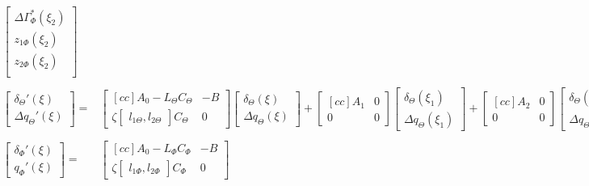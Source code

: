 \documentclass[main.tex]{subfiles}
\begin{document}
\begin{align}
\begin{bmatrix}
	\Delta \Gamma_\Phi^{*}(\xi_2) \\
	z_{1\Phi}(\xi_2) \\
	z_{2\Phi}(\xi_2) \\
	\end{bmatrix} \label{eq:SynthesisConAzi}\\
	\nonumber\\
	\begin{bmatrix}
	\delta_\Theta  '(\xi) \\
	\Delta q_\Theta'(\xi)
	\end{bmatrix} =&
	\begin{bmatrix}[cc]
	A_0 - L_\Theta C_\Theta & -B\\ 
	\zeta \begin{bmatrix}l_{1\Theta} , l_{2\Theta}	\end{bmatrix} C_\Theta & 0
	\end{bmatrix}
	\begin{bmatrix}
	\delta_\Theta (\xi)\\
	\Delta q_\Theta (\xi)
	\end{bmatrix} + 
	\begin{bmatrix}[cc]
	A_1 & 0\\ 
	0 & 0
	\end{bmatrix}
	\begin{bmatrix}
	\delta_\Theta (\xi_1)\\
	\Delta q_\Theta (\xi_1)
	\end{bmatrix} + 
	\begin{bmatrix}[cc]
	A_2 & 0\\ 
	0 & 0
	\end{bmatrix}
	\begin{bmatrix}
	\delta_\Theta (\xi_2)\\
	\Delta q_\Theta (\xi_2)
	\end{bmatrix} \label{eq:SynthesisObsInc}\\
    	\nonumber \\
    	\begin{bmatrix}
    	\delta_\Phi  '(\xi) \\
    	q_\Phi'(\xi)
    	\end{bmatrix} =&
    	\begin{bmatrix}[cc]
    	A_0 - L_\Phi C_\Phi & -B\\ 
    	\zeta \begin{bmatrix}l_{1\Phi} , l_{2\Phi}	\end{bmatrix} C_\Phi & 0
    	\end{bmatrix}

\end{align}
\end{document}

